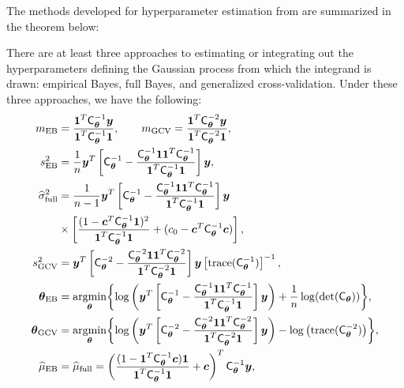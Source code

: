 \documentclass{svjour3}                     %
\newcommand{\bm}[1]{\boldsymbol{#1}}
\newcommand{\trace}[1]{\textup{trace}{#1}}
\newcommand{\vtheta}{{\bm{\theta}}}
\newcommand{\vc}{\bm{c}}
\newcommand{\vy}{\bm{y}}
\newcommand{\vone}{\bm{1}}
\newcommand{\mC}{\mathsf{C}}
\newcommand{\mCthetaInv}{{\mathsf{C}^{-1}_{\vtheta}}}
\newcommand{\hmu}{\widehat{\mu}}
\newcommand{\hsigma}{\widehat{\sigma}}
\newcommand{\MLE}{\textup{EB}}
\newcommand{\full}{\textup{full}}
\newcommand{\GCV}{\textup{GCV}}
\providecommand{\argmin}{\operatorname*{argmin}}
\begin{document}
\iffalse

The methods developed for hyperparameter estimation from \cite{JagHic19a} are summarized in the theorem below:
\begin{theorem} \label{thm:param} There are at least three approaches to estimating or integrating out the hyperparameters defining the Gaussian process from which the integrand is drawn: empirical Bayes, full Bayes, and generalized cross-validation.  %
	Under these three approaches, we have the following:
	\begin{align}
	\label{eqn_m_MLE}
	m_\MLE &= \frac{\vone^T \mCthetaInv \vy }{ \vone^T \mCthetaInv \vone}, \qquad
	m_{\textup{GCV}} = \frac{\vone^T \mC_\vtheta^{-2} \vy}{\vone^T \mC_\vtheta^{-2} \vone}, \\
	\label{eqn_s2_MLE}
	s^2_{\MLE} 
	&= 
	\frac{1}{n}
	\vy^T 
	\left[ \mCthetaInv - 
	\frac{ \mCthetaInv \vone \vone^T \mCthetaInv }{\vone^T\mCthetaInv \vone}
	\right] \vy, \\
	\nonumber
	\hsigma_{\full}^2 
	& = \frac{1}{n-1}
	\vy^T\left[ \mCthetaInv 
	- \frac{ \mCthetaInv \vone\vone^T \mCthetaInv}{\vone^T \mCthetaInv \vone}  \right]\vy
	\\ 
	\label{eqn:sigma2_full}
	& \times  \left[\frac{(1 - \vc^T \mCthetaInv \vone)^2}{\vone^T \mCthetaInv \vone} + (c_{0}  -\vc ^T \mCthetaInv \vc) \right], \\
	\nonumber
	s^2_{\textup{GCV}} & = \vy^T \left[\mC_\vtheta^{-2} - \frac{\mC_\vtheta^{-2} \vone \vone^T \mC_\vtheta^{-2}}{\vone^T \mC_\vtheta^{-2} \vone}  \right] \vy  \left[ \trace(\mCthetaInv) \right]^{-1}, \\
	\label{eqn:thetaMLE}
	\vtheta_\MLE
	&= \argmin_{\vtheta} \biggl \{
	\log\left(\vy^T 
	\left[ \mCthetaInv - 
	\frac{ \mCthetaInv \vone \vone^T \mCthetaInv }{\vone^T\mCthetaInv \vone}
	\right] \vy 
	\right)  
	+  \frac{1}{n} \log(\det(\mC_\vtheta))
	\biggr \}, \\
	\label{vthetaGCV}
	\vtheta_{\GCV} &= \argmin_\vtheta \biggl\{\log \left(  \vy^T \left[\mC^{-2}_\vtheta - \frac{\mC^{-2}_\vtheta \vone \vone^T \mC^{-2}_\vtheta}{\vone^T \mC^{-2}_\vtheta \vone}  \right] \vy \right)  
	- \log \left ( \trace(\mC^{-2}_\vtheta) \right ) \biggr\}, \\
	\label{eqn:cubMLE}
	\hmu_\MLE  &= \hmu_\full =
	\left(
	\frac{ (1 - \vone^T  \mCthetaInv\vc )  \vone }{ \vone^T \mCthetaInv \vone}   +  \vc 
	\right)^T  \mCthetaInv \vy, \\

\end{align}
\end{theorem}
\end{document}
